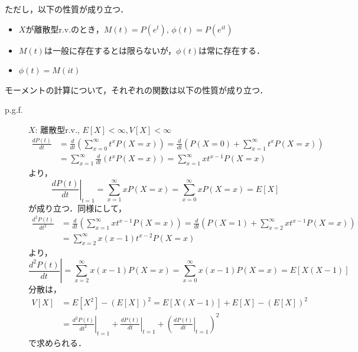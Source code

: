 \documentclass{jsreport}
\begin{document}
ただし，以下の性質が成り立つ．
\begin{itemize}
  \item $X$が離散型r.v.のとき，$M(t) = P(e^t), \, \phi(t) = P(e^{it})$
  \item $M(t)$は一般に存在するとは限らないが，$\phi(t)$は常に存在する．
  \item $\phi(t) = M(it)$
\end{itemize}

モーメントの計算について，それぞれの関数は以下の性質が成り立つ．
\begin{description}
  \item[p.g.f.]
  $X$: 離散型r.v., $E[X] < \infty, V[X] < \infty$
  \begin{align}
    \frac{dP(t)}{dt} &= \frac{d}{dt} \left(\sum_{x = 0}^{\infty} t^x P(X = x) \right) = \frac{d}{dt} \left(P(X = 0) + \sum_{x=1}^{\infty} t^x P(X = x)\right) \nonumber \\
    &= \sum_{x=1}^{\infty} \frac{d}{dt} (t^x P(X = x)) = \sum_{x = 1}^{\infty} x t^{x - 1} P(X = x) \nonumber
  \end{align}
  より，
  \begin{equation}
    \left.\frac{dP(t)}{dt}\right|_{t = 1} = \sum_{x = 1}^{\infty} xP(X = x) = \sum_{x = 0}^{\infty} xP(X = x) = E[X] \nonumber
  \end{equation}
  が成り立つ．同様にして，
  \begin{align}
    \frac{d^2P(t)}{dt^2} &= \frac{d}{dt} \left(\sum_{x = 1}^{\infty} x t^{x - 1} P(X = x)\right) = \frac{d}{dt} \left(P(X = 1) + \sum_{x = 2}^{\infty} xt^{x - 1} P(X = x)\right) \nonumber \\
    &= \sum_{x = 2}^{\infty} x(x - 1)t^{x - 2} P(X = x) \nonumber
  \end{align}
  より，
  \begin{equation}
    \left.\frac{d^2P(t)}{dt}\right| = \sum_{x = 2}^{\infty} x(x - 1)P(X = x) = \sum_{x = 0}^{\infty} x(x - 1)P(X = x) = E[X(X - 1)] \nonumber
  \end{equation}
  分散は，
  \begin{align}
    V[X] &= E[X^2] - (E[X])^2 = E[X(X - 1)] + E[X] - (E[X])^2 \nonumber \\
    &= \left.\frac{d^2 P(t)}{dt^2}\right|_{t = 1} + \left.\frac{d P(t)}{dt}\right|_{t = 1} + \left(\left.\frac{d P(t)}{dt}\right|_{t = 1}\right)^2 \nonumber
  \end{align}
  で求められる．


\end{description}
\end{document}
